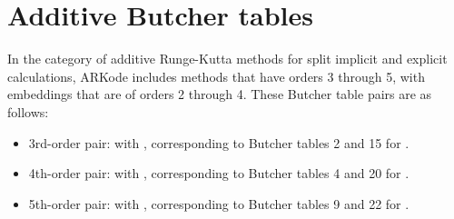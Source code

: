 \documentclass[letterpaper,10pt,english]{sphinxmanual}
\begin{document}
\section{Additive Butcher tables}
\label{Butcher:additive-butcher-tables}\label{Butcher:butcher-additive}
In the category of additive Runge-Kutta methods for split implicit and
explicit calculations, ARKode includes methods that have orders 3
through 5, with embeddings that are of orders 2 through 4.  These
Butcher table pairs are as follows:
\begin{itemize}
\item {} 
3rd-order pair:
{\hyperref[Butcher:butcher-ark-4-2-3-e]{\emph{}}} with {\hyperref[Butcher:butcher-ark-4-2-3-i]{\emph{}}},
corresponding to Butcher tables 2 and 15 for
{\hyperref[c_interface/User_callable:c.ARKodeSetARKTableNum]{\emph{}}}.

\item {} 
4th-order pair:
{\hyperref[Butcher:butcher-ark-6-3-4-e]{\emph{}}} with {\hyperref[Butcher:butcher-ark-6-3-4-i]{\emph{}}},
corresponding to Butcher tables 4 and 20 for
{\hyperref[c_interface/User_callable:c.ARKodeSetARKTableNum]{\emph{}}}.

\item {} 
5th-order pair:
{\hyperref[Butcher:butcher-ark-8-4-5-e]{\emph{}}} with {\hyperref[Butcher:butcher-ark-8-4-5-i]{\emph{}}},
corresponding to Butcher tables 9 and 22 for
{\hyperref[c_interface/User_callable:c.ARKodeSetARKTableNum]{\emph{}}}.

\end{itemize}
\label{References:references}
\end{document}

